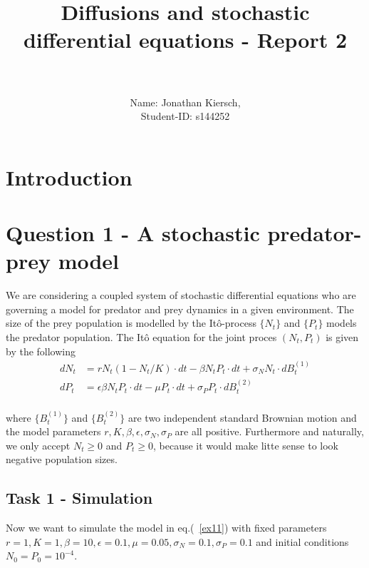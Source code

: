 \documentclass[a4paper,12pt]{article}
\date{}
\title{Diffusions and stochastic differential equations - Report 2}
\author{\\\mbox{} \\Name: Jonathan Kiersch, \mbox{} \\ Student-ID: s144252 }
\begin{document}
\maketitle
\thispagestyle{fancy}

\section{Introduction}



\section{Question 1 - A stochastic predator-prey model}

We are considering a coupled system of stochastic differential equations who are governing a model for predator and prey dynamics in a given environment. The size of the prey population is modelled by the It\^{o}-process $\{N_t\}$ and $\{P_t\}$ models the predator population. The It\^{o} equation for the joint proces $(N_t, P_t)$ is given by the following\\

\begin{equation}
\begin{aligned}
\label{ex11}
dN_t&= rN_t(1-N_t/K)\cdot dt-\beta N_tP_t\cdot dt +\sigma_N N_t \cdot dB_t^{(1)}\\
dP_t&= \epsilon \beta N_t P_t\cdot dt-\mu P_t\cdot dt +\sigma_P P_t \cdot dB_t^{(2)}\\
\end{aligned}
\end{equation}

where $\{B_t^{(1)}\}$ and $\{B_t^{(2)}\}$ are two independent standard Brownian motion and the model parameters $r, K, \beta, \epsilon, \sigma_N, \sigma_P$ are all positive. Furthermore and naturally, we only accept $N_t\geq 0$ and $P_t\geq 0$, because it would make litte sense to look negative population sizes.\\

\subsection{Task 1 - Simulation}


Now we want to simulate the model in eq.(~\ref{ex11}) with fixed parameters $r=1, K=1, \beta=10, \epsilon=0.1, \mu= 0.05, \sigma_N=0.1, \sigma_P=0.1$ and initial conditions $N_0=P_0=10^{-4}$.\\
\end{document}
